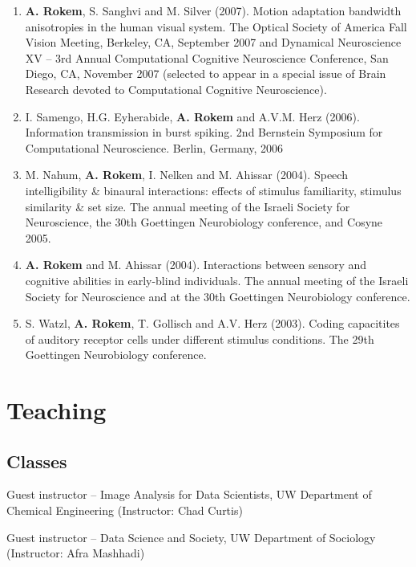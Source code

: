 \documentclass[11pt,fullpage]{article}
\newcommand{\years}[1]{\marginnote{\scriptsize #1}} %
\begin{document}
\begin{enumerate}
\item {\bf A. Rokem}, S. Sanghvi and M. Silver (2007). Motion adaptation bandwidth anisotropies in the human visual system. The Optical Society of America Fall Vision Meeting, Berkeley, CA, September 2007 and Dynamical Neuroscience XV – 3rd Annual Computational Cognitive Neuroscience Conference, San Diego, CA, November 2007 (selected to appear in a special issue of Brain Research devoted to Computational Cognitive Neuroscience).

\item I. Samengo, H.G. Eyherabide, {\bf A. Rokem} and A.V.M. Herz (2006). Information transmission in burst spiking. 2nd Bernstein Symposium for Computational Neuroscience. Berlin, Germany, 2006

\item M. Nahum, {\bf A. Rokem}, I. Nelken and M. Ahissar (2004). Speech intelligibility \& binaural interactions: effects of stimulus familiarity, stimulus similarity \& set size. The annual meeting of the Israeli Society for Neuroscience, the 30th Goettingen Neurobiology conference, and Cosyne 2005.

\item {\bf A. Rokem} and M. Ahissar (2004). Interactions between sensory and cognitive abilities in early-blind individuals. The annual meeting of the Israeli Society for Neuroscience and at the 30th Goettingen Neurobiology conference.

\item S. Watzl, {\bf A. Rokem}, T. Gollisch and A.V. Herz (2003). Coding capacitites of auditory receptor cells under different stimulus conditions. The 29th Goettingen Neurobiology conference.
\end{enumerate}


\section*{Teaching}

\subsection*{Classes}

\years{5/2021} Guest instructor -- Image Analysis for Data Scientists,  UW Department of Chemical Engineering (Instructor: Chad Curtis)

\years{5/2018} Guest instructor -- Data Science and Society, UW Department of Sociology (Instructor: Afra Mashhadi)
\end{document}
